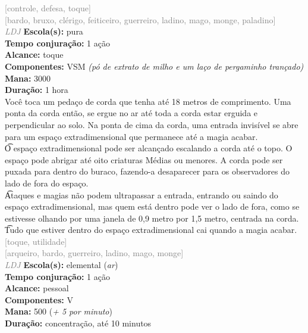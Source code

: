 \documentclass{RPG_Adventure}[2021/10/20]
\begin{document}
{\scriptsize \textcolor{gray}{[controle, defesa, toque]\\}}
{\scriptsize \textcolor{gray}{[bardo, bruxo, clérigo, feiticeiro, guerreiro, ladino, mago, monge, paladino]\\}}
{\tiny \textcolor{gray}{\textit{LDJ}}}
{\small \t \textbf{Escola(s):} pura\\\t \textbf{Tempo conjuração:} 1 ação\\\t \textbf{Alcance:} toque\\\t \textbf{Componentes:} VSM \textit{(pó de extrato de milho e um laço de pergaminho trançado)}\\\t \textbf{Mana:} 3000\\\t \textbf{Duração:} 1 hora\\}
{\normalsize Você toca um pedaço de corda que tenha até 18 metros de comprimento. Uma ponta da corda então, se ergue no ar até toda a corda estar erguida e perpendicular ao solo. Na ponta de cima da corda, uma entrada invisível se abre para um espaço extradimensional que permanece até a magia acabar.\\\t O espaço extradimensional pode ser alcançado escalando a corda até o topo. O espaço pode abrigar até oito criaturas Médias ou menores. A corda pode ser puxada para dentro do buraco, fazendo-a desaparecer para os observadores do lado de fora do espaço.\\\t Ataques e magias não podem ultrapassar a entrada, entrando ou saindo do espaço extradimensional, mas quem está dentro pode ver o lado de fora, como se estivesse olhando por uma janela de 0,9 metro por 1,5 metro, centrada na corda.\\\t Tudo que estiver dentro do espaço extradimensional cai quando a magia acabar.\\}
{\scriptsize \textcolor{gray}{[toque, utilidade]\\}}
{\scriptsize \textcolor{gray}{[arqueiro, bardo, guerreiro, ladino, mago, monge]\\}}
{\tiny \textcolor{gray}{\textit{LDJ}}}
{\small \t \textbf{Escola(s):} elemental (\textit{ar})\\\t \textbf{Tempo conjuração:} 1 ação\\\t \textbf{Alcance:} pessoal\\\t \textbf{Componentes:} V\\\t \textbf{Mana:} 500 (\textit{+ 5 por minuto})\\\t \textbf{Duração:} concentração, até 10 minutos\\}
\end{document}
